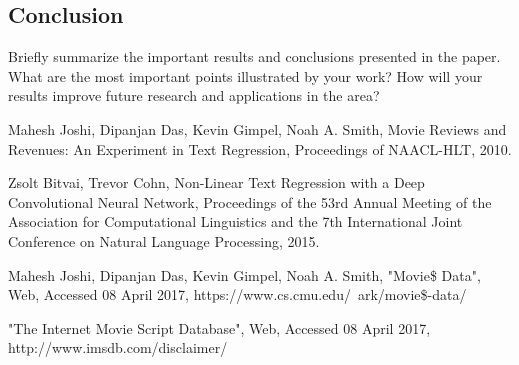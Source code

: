 \documentclass[11pt]{article}
\begin{document}
\begin{multicols}{2}
\section{Conclusion}
Briefly summarize the important results and conclusions presented in the paper. What are the most important points illustrated by your work? How will your results improve future research and applications in the area? 

\begin{thebibliography}{9}

  Mahesh Joshi, Dipanjan Das, Kevin Gimpel, Noah A. Smith,
  Movie Reviews and Revenues: An Experiment in Text Regression,
  Proceedings of NAACL-HLT,
  2010.
  
    Zsolt Bitvai, Trevor Cohn,
    Non-Linear Text Regression with a Deep Convolutional Neural Network,
    Proceedings of the 53rd Annual Meeting of the Association for Computational Linguistics
    and the 7th International Joint Conference on Natural Language Processing,
    2015.
    
  Mahesh Joshi, Dipanjan Das, Kevin Gimpel, Noah A. Smith,
  "Movie\$ Data",
  Web,
  Accessed 08 April 2017,
  https://www.cs.cmu.edu/~ark/movie\$-data/

    "The Internet Movie Script Database",
    Web,
    Accessed 08 April 2017,
    http://www.imsdb.com/disclaimer/
  
\end{thebibliography}
\end{multicols}
\end{document}
